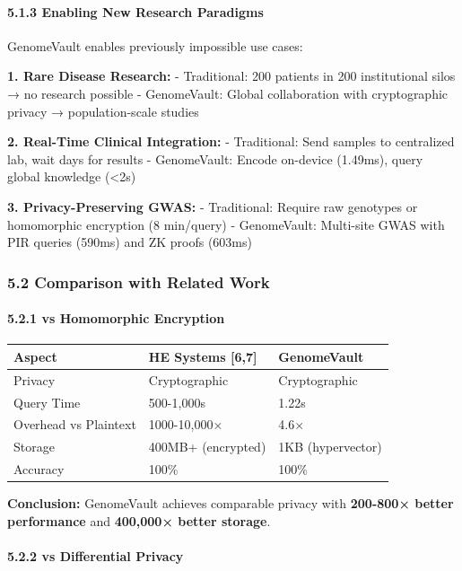 \documentclass[
  11pt,
]{article}
\begin{document}
\paragraph{5.1.3 Enabling New Research
Paradigms}\label{enabling-new-research-paradigms}

GenomeVault enables previously impossible use cases:

\textbf{1. Rare Disease Research:} - Traditional: 200 patients in 200
institutional silos → no research possible - GenomeVault: Global
collaboration with cryptographic privacy → population-scale studies

\textbf{2. Real-Time Clinical Integration:} - Traditional: Send samples
to centralized lab, wait days for results - GenomeVault: Encode
on-device (1.49ms), query global knowledge (\textless2s)

\textbf{3. Privacy-Preserving GWAS:} - Traditional: Require raw
genotypes or homomorphic encryption (8 min/query) - GenomeVault:
Multi-site GWAS with PIR queries (590ms) and ZK proofs (603ms)

\subsubsection{5.2 Comparison with Related
Work}\label{comparison-with-related-work}

\paragraph{5.2.1 vs Homomorphic
Encryption}\label{vs-homomorphic-encryption}

\begin{longtable}[]{@{}lll@{}}
\toprule\noalign{}
Aspect & HE Systems {[}6,7{]} & GenomeVault \\
\midrule\noalign{}
\endhead
\bottomrule\noalign{}
\endlastfoot
Privacy & Cryptographic & Cryptographic \\
Query Time & 500-1,000s & 1.22s \\
Overhead vs Plaintext & 1000-10,000× & 4.6× \\
Storage & 400MB+ (encrypted) & 1KB (hypervector) \\
Accuracy & 100\% & 100\% \\
\end{longtable}

\textbf{Conclusion:} GenomeVault achieves comparable privacy with
\textbf{200-800× better performance} and \textbf{400,000× better
storage}.

\paragraph{5.2.2 vs Differential Privacy}\label{vs-differential-privacy}
\end{document}
